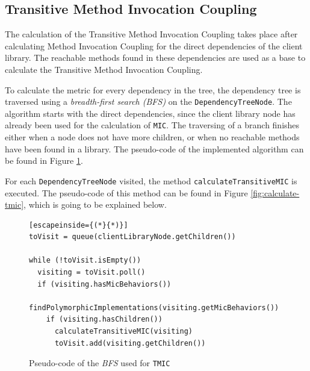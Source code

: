 \subsection{Transitive Method Invocation Coupling}
The calculation of the Transitive Method Invocation Coupling takes place after calculating Method Invocation Coupling for the direct dependencies of the client library. The reachable methods found in these dependencies are used as a base to calculate the Transitive Method Invocation Coupling.

To calculate the metric for every dependency in the tree, the dependency tree is traversed using a \textit{breadth-first search (BFS)} on the \texttt{DependencyTreeNode}. The algorithm starts with the direct dependencies, since the client library node has already been used for the calculation of \texttt{MIC}. The traversing of a branch finishes either when a node does not have more children, or when no reachable methods have been found in a library. The pseudo-code of the implemented algorithm can be found in Figure \ref{fig:tree-traversing-tmic}.

For each \texttt{DependencyTreeNode} visited, the method \texttt{calculateTransitiveMIC} is executed. The pseudo-code of this method can be found in Figure \ref{fig:calculate-tmic}, which is going to be explained below.

\begin{figure}[ht!]
\begin{lstlisting}[escapeinside={(*}{*)}]
toVisit = queue(clientLibraryNode.getChildren())

while (!toVisit.isEmpty())
  visiting = toVisit.poll()
  if (visiting.hasMicBehaviors())
    findPolymorphicImplementations(visiting.getMicBehaviors())
    if (visiting.hasChildren())
      calculateTransitiveMIC(visiting)
      toVisit.add(visiting.getChildren())
\end{lstlisting}
\caption{Pseudo-code of the \textit{BFS} used for \texttt{TMIC}}
\label{fig:tree-traversing-tmic}
\end{figure}

